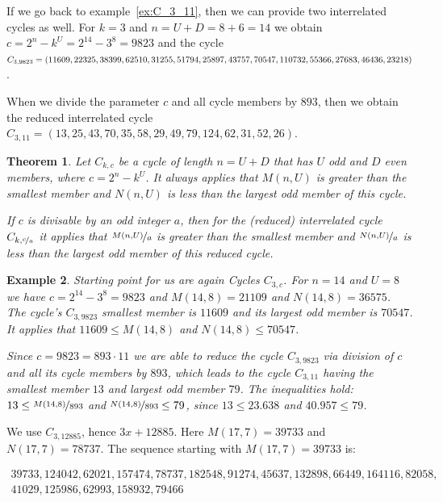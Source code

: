 \documentclass[12pt]{amsart}
\newtheorem{theorem}{Theorem}[section]
\newtheorem{example}[theorem]{Example}
\theoremstyle{definition}
\begin{document}
If we go back to example~\ref{ex:C_3_11}, then we can provide two interrelated cycles as well. For $k=3$ and $n=U+D=8+6=14$ we obtain $c=2^n-k^U=2^{14}-3^8=9823$ and the cycle $C_{3,9823}=(11609,22325,38399,62510,31255,51794,25897,43757,70547,110732,55366,\\27683,46436,23218)$.

When we divide the parameter $c$ and all cycle members by $893$, then we obtain the reduced interrelated cycle $C_{3,11}=(13,25,43,70,35,58,29,49,79,124,62,31,52,26)$.

\begin{theorem}
\label{theo:containment_M_N}
Let $C_{k,c}$ be a cycle of length $n=U+D$ that has $U$ odd and $D$ even members, where $c=2^n-k^U$. It always applies that $M(n,U)$ is greater than the smallest member and $N(n,U)$ is less than the largest odd member of this cycle.

If $c$ is divisable by an odd integer $a$, then for the (reduced) interrelated cycle $C_{k,\nicefrac{c}{a}}$ it applies that $\nicefrac{M(n,U)}{a}$ is greater than the smallest member and $\nicefrac{N(n,U)}{a}$ is less than the largest odd member of this reduced cycle.
\end{theorem}

\begin{example}
\label{ex:interrelated_M_N}
Starting point for us are again Cycles $C_{3,c}$. For $n=14$ and $U=8$ we have $c=2^{14}-3^8=9823$ and $M(14,8)=21109$ and $N(14,8)=36575$. The cycle's $C_{3,9823}$ smallest member is $11609$ and its largest odd member is $70547$. It applies that $11609\le M(14,8)$ and $N(14,8)\le70547$.

Since $c=9823=893\cdot11$ we are able to reduce the cycle $C_{3,9823}$ via division of $c$ and all its cycle members by $893$, which leads to the cycle $C_{3,11}$ having the smallest member $13$ and largest odd member $79$. The inequalities hold: $13\le\nicefrac{M(14,8)}{893}$ and $\nicefrac{N(14,8)}{893}\le79$, since $13\le23.638$ and $40.957\le79$.
\end{example}

\par
We use $C_{3,12885}$, hence $3x+12885$. Here $M(17,7)=39733$ and $N(17,7)=78737$. The sequence starting with $M(17,7)=39733$ is:

\[
\begin{array}{l}
39733,124042,62021,157474,78737,182548,91274,45637,132898,66449,164116,82058,\\
41029,125986,62993,158932,79466
\end{array}
\]
\end{document}
